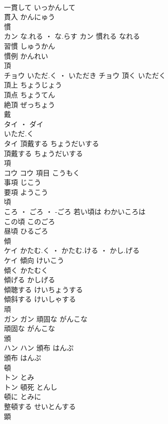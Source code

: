 \documentclass[8pt]{extreport}
\begin{document}
\begin{CJK}{UTF8}{min}
\\	一貫して	いっかんして	
\\	貫入	かんにゅう	
\\	慣	
\\	カン	な.れる ・ な.らす	カン	慣れる	なれる	
\\	習慣	しゅうかん	
\\	慣例	かんれい	
\\	頂	
\\	チョウ	いただ.く ・ いただき	チョウ	頂く	いただく	
\\	頂上	ちょうじょう	
\\	頂点	ちょうてん	
\\	絶頂	ぜっちょう	
\\	戴	
\\	タイ ・ ダイ
\\	いただ.く
\\	タイ	頂戴する	ちょうだいする	
\\	頂戴する	ちょうだいする	
\\	項	
\\	コウ		コウ	項目	こうもく	
\\	事項	じこう	
\\	要項	ようこう	
\\	頃	
\\	ころ ・ ごろ ・ -ごろ		若い頃は	わかいころは	
\\	この頃	このごろ	
\\	昼頃	ひるごろ	
\\	傾	
\\	ケイ	かたむ.く ・ かたむ.ける ・ かし.げる
\\	ケイ	傾向	けいこう	
\\	傾く	かたむく	
\\	傾げる	かしげる	
\\	傾聴する	けいちょうする	
\\	傾斜する	けいしゃする	
\\	頑	
\\	ガン		ガン	頑固な	がんこな	
\\	頑固な	がんこな	
\\	頒	
\\	ハン		ハン	頒布	はんぷ	
\\	頒布	はんぷ	
\\	頓	
\\	トン	とみ
\\	トン	頓死	とんし	
\\	頓に	とみに	
\\	整頓する	せいとんする	
\\	顕	

\end{CJK}
\end{document}
